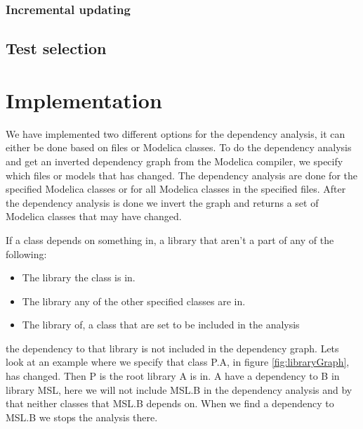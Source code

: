 \documentclass{cslthse-msc}
\begin{document}
\subsection{Incremental updating}

\section{Test selection}

\chapter[Implementation]{Implementation}
We have implemented two different options for the dependency analysis, it can either be done based on files or Modelica classes. To do the dependency analysis and get an inverted dependency graph from the Modelica compiler, we specify which files or models that has changed. The dependency analysis are done for the specified Modelica classes or for all Modelica classes in the specified files. After the dependency analysis is done we invert the graph and returns a set of Modelica classes that may have changed.

If a class depends on something in, a library that aren't a part of any of the following: 
\begin{itemize}
	\item The library the class is in.
	\item The library any of the other specified classes are in.
	\item The library of, a class that are set to be included in the analysis
\end{itemize}
the dependency to that library is not included in the dependency graph. Lets look at an example where we specify that class P.A, in figure \ref{fig:libraryGraph}, has changed. Then P is the root library A is in. A have a dependency to B in library MSL, here we will not include MSL.B in the dependency analysis and by that neither classes that MSL.B depends on. When we find a dependency to MSL.B we stops the analysis there.
\end{document}
